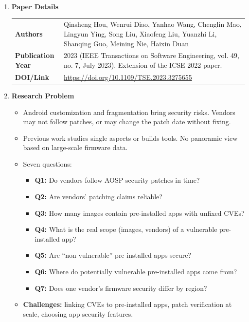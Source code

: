 \documentclass[11pt,a4paper]{article}
\newcommand{\entrypart}[1]{\textbf{\color{accent}#1}\par\vspace{2pt}}
\begin{document}
\begin{enumerate}

    \item \entrypart{Paper Details}

    \begin{tabular}{@{}>{\bfseries}p{3.2cm} p{11.5cm}@{}}
        Authors          & Qinsheng Hou, Wenrui Diao, Yanhao Wang, Chenglin Mao, Lingyun Ying, Song Liu, Xiaofeng Liu, Yuanzhi Li, Shanqing Guo, Meining Nie, Haixin Duan \\[2pt]
        Publication Year & 2023 (IEEE Transactions on Software Engineering, vol. 49, no. 7, July 2023). Extension of the ICSE 2022 paper. \\[2pt]
        DOI/Link         & \url{https://doi.org/10.1109/TSE.2023.3275655}
    \end{tabular}

    \item \entrypart{Research Problem}

    \begin{itemize}
        \item Android customization and fragmentation bring security risks. Vendors may not follow patches, or may change the patch date without fixing.
        \item Previous work studies single aspects or builds tools. No panoramic view based on large-scale firmware data.
        \item Seven questions:
        \begin{itemize}
            \item \textbf{Q1:} Do vendors follow AOSP security patches in time?
            \item \textbf{Q2:} Are vendors' patching claims reliable?
            \item \textbf{Q3:} How many images contain pre-installed apps with unfixed CVEs?
            \item \textbf{Q4:} What is the real scope (images, vendors) of a vulnerable pre-installed app?
            \item \textbf{Q5:} Are ``non-vulnerable'' pre-installed apps secure?
            \item \textbf{Q6:} Where do potentially vulnerable pre-installed apps come from?
            \item \textbf{Q7:} Does one vendor's firmware security differ by region?
        \end{itemize}
        \item \textbf{Challenges:} linking CVEs to pre-installed apps, patch verification at scale, choosing app security features.
    \end{itemize}


\end{enumerate}
\end{document}
